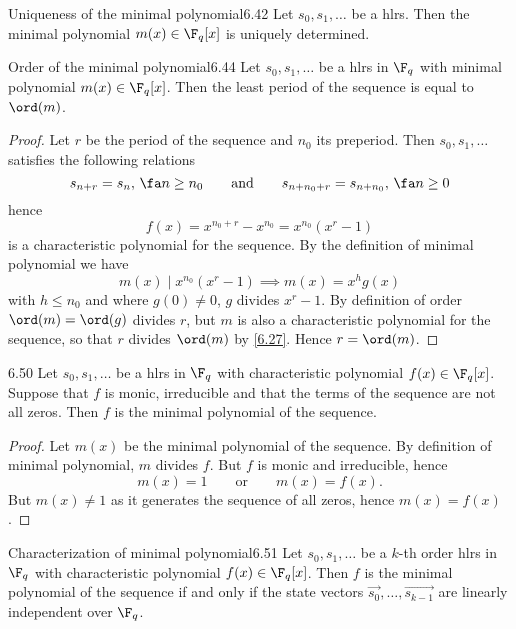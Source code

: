 \begin{teor}{Uniqueness of the minimal polynomial}{6.42}
	Let \(s_0,s_1,\ldots\) be a hlrs. Then the minimal polynomial \(m(x)\in\F_q[x]\) is uniquely determined.
\end{teor}

\begin{teor}{Order of the minimal polynomial}{6.44}
	Let \(s_0,s_1,\ldots\) be a hlrs in \(\F_q\) with minimal polynomial \(m(x)\in\F_q[x]\). Then the least period of the sequence is equal to \(\ord(m)\).
\end{teor}

\begin{proof}
	Let \(r\) be the period of the sequence and \(n_0\) its preperiod. Then \(s_0,s_1,\ldots\) satisfies the following relations
	\[
		s_{n+r} = s_n,\,\fa n \ge n_0 \qquad\text{and}\qquad s_{n+n_0+r} = s_{n+n_0},\,\fa n\ge 0
	\]
	hence
	\[
		f(x) = x^{n_0+r}-x^{n_0} = x^{n_0}(x^r-1)
	\]
	is a characteristic polynomial for the sequence. By the definition of minimal polynomial we have
	\[
		m(x) \mid x^{n_0}(x^r-1) \implies m(x) = x^h g(x)
	\]
	with \(h\le n_0\) and where \(g(0)\neq 0\), \(g\) divides \(x^r-1\). By definition of order \(\ord(m)=\ord(g)\) divides \(r\), but \(m\) is also a characteristic polynomial for the sequence, so that \(r\) divides \(\ord(m)\) by \autoref{6.27}. Hence \(r = \ord(m)\).
\end{proof}

\begin{prop}{}{6.50}
	Let \(s_0,s_1,\ldots\) be a hlrs in \(\F_q\) with characteristic polynomial \(f(x)\in\F_q[x]\). Suppose that \(f\) is monic, irreducible and that the terms of the sequence are not all zeros. Then \(f\) is the minimal polynomial of the sequence.
\end{prop}

\begin{proof}
	Let \(m(x)\) be the minimal polynomial of the sequence. By definition of minimal polynomial, \(m\) divides \(f\). But \(f\) is monic and irreducible, hence
	\[
		m(x) = 1 \qquad\text{or}\qquad m(x) = f(x).
	\]
	But \(m(x)\neq 1\) as it generates the sequence of all zeros, hence \(m(x)=f(x)\).
\end{proof}

\begin{teor}{Characterization of minimal polynomial}{6.51}
	Let \(s_0,s_1,\ldots\) be a \(k\)-th order hlrs in \(\F_q\) with characteristic polynomial \(f(x)\in\F_q[x]\). Then \(f\) is the minimal polynomial of the sequence if and only if the state vectors \(\vec{s_0},\ldots,\vec{s_{k-1}}\) are linearly independent over \(\F_q\).
\end{teor}

